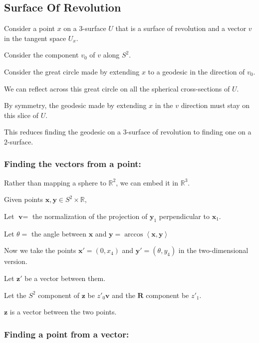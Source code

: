 \subsection{Surface Of Revolution}

Consider a point $x$ on a $3$-surface $U$ that is a surface of revolution and a vector $v$ in the tangent space $U_x$.

Consider the component $v_0$ of $v$ along $S^2$.

Consider the great circle made by extending $x$ to a geodesic in the direction of $v_0$.

We can reflect across this great circle on all the spherical cross-sections of $U$.

By symmetry, the geodesic made by extending $x$ in the $v$ direction must stay on this slice of $U$.

This reduces finding the geodesic on a $3$-surface of revolution to finding one on a $2$-surface.

\bigskip

\subsubsection{Finding the vectors from a point:}

\bigskip

Rather than mapping a sphere to $\mathbb{R}^2$, we can embed it in $\mathbb{R}^3$.

Given points $\textbf{x}, \textbf{y} \in S^2 \times \mathbb{R}$,

Let $\textbf{v} =$ the normalization of the projection of $\textbf{y}_1$ perpendicular to $\textbf{x}_1$.

Let $\theta =$ the angle between $\textbf{x}$ and $\textbf{y} = \arccos\left<\textbf{x},\textbf{y}\right>$

Now we take the points $\textbf{x}' = (0,x_4)$ and $\textbf{y}' = (\theta, y_4)$ in the two-dimensional version.

Let $\textbf{z}'$ be a vector between them.

Let the $S^2$ component of $\textbf{z}$ be $z'_0\textbf{v}$ and the $\textbf{R}$ component be $z'_1$.

$\textbf{z}$ is a vector between the two points.

\bigskip

\subsubsection{Finding a point from a vector:}

